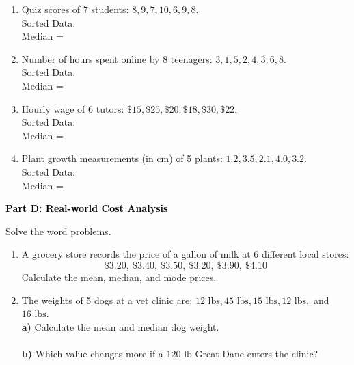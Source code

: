 \documentclass[12pt, letterpaper, fleqn]{article}
\newcommand{\blanklong}{\underline{\hspace{6.5cm}}}
\newcommand{\blankshorter}{\underline{\hspace{1.5cm}}}
\begin{document}
\begin{enumerate}[itemsep=2.5cm, leftmargin=0.6cm]
\item Quiz scores of 7 students: $8, 9, 7, 10, 6, 9, 8$. \\
Sorted Data: \blanklong \\
Median = \blankshorter

\item Number of hours spent online by 8 teenagers: $3, 1, 5, 2, 4, 3, 6, 8$. \\
Sorted Data: \blanklong \\
Median = \blankshorter

\item Hourly wage of 6 tutors: $\$15, \$25, \$20, \$18, \$30, \$22$. \\
Sorted Data: \blanklong \\
Median = \blankshorter

\item Plant growth measurements (in cm) of 5 plants: $1.2, 3.5, 2.1, 4.0, 3.2$. \\
Sorted Data: \blanklong \\
Median = \blankshorter
\end{enumerate}

\newpage

\begin{tcolorbox}[colback=black!10]
    \large\textcolor{black}{\textbf{Part D: Real-world Cost Analysis}}
\end{tcolorbox}

\vspace{3mm}

\noindent
Solve the word problems.

\vspace{5mm}

\begin{enumerate}[itemsep=2.5cm, leftmargin=0.6cm]
\item A grocery store records the price of a gallon of milk at 6 different local stores: \\
$$\$3.20, \ \$3.40, \ \$3.50, \ \$3.20, \ \$3.90, \ \$4.10$$
Calculate the mean, median, and mode prices.
\vspace{1.5cm}

\item The weights of 5 dogs at a vet clinic are: $12\text{ lbs}, 45\text{ lbs}, 15\text{ lbs}, 12\text{ lbs},$ and $16\text{ lbs}$. \\
\textbf{a)} Calculate the mean and median dog weight. \\
\blanklong \\
\textbf{b)} Which value changes more if a $120\text{-lb}$ Great Dane enters the clinic? \\
\blanklong
\end{enumerate}
\end{document}
